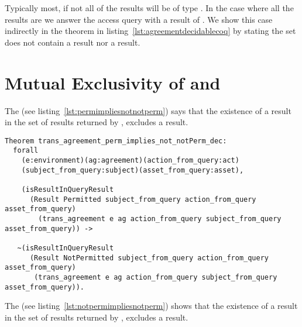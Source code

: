 Typically most, if not all of the results will be of type . In the case where all the results are  we answer the access query with a result of . We show this case indirectly in the theorem in listing~\ref{lst:agreementdecidablecoq} by stating the set does not contain a  result nor a  result. 

\section{Mutual Exclusivity of  and }

The  (see listing~\ref{lst:permimpliesnotnotperm}) says that the existence of a  result in the set of results returned by , excludes a  result.


\begin{lstlisting}
Theorem trans_agreement_perm_implies_not_notPerm_dec:
  forall
    (e:environment)(ag:agreement)(action_from_query:act)
    (subject_from_query:subject)(asset_from_query:asset),

    (isResultInQueryResult 
      (Result Permitted subject_from_query action_from_query asset_from_query)
        (trans_agreement e ag action_from_query subject_from_query asset_from_query)) ->

   ~(isResultInQueryResult 
      (Result NotPermitted subject_from_query action_from_query asset_from_query)
       (trans_agreement e ag action_from_query subject_from_query asset_from_query)).
\end{lstlisting}


The   (see listing~\ref{lst:notpermimpliesnotperm}) shows that the existence of a  result in the set of results returned by , excludes a  result.

